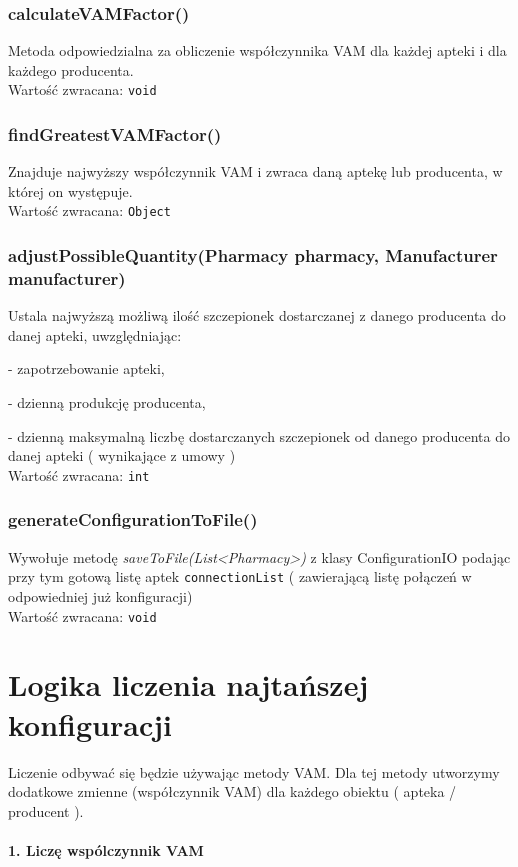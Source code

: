 \documentclass[]{article}
\begin{document}
    \subsubsection{calculateVAMFactor()}
    Metoda odpowiedzialna za obliczenie współczynnika VAM dla każdej apteki i dla każdego producenta. \\
    Wartość zwracana: \verb|void|

    \subsubsection{findGreatestVAMFactor()}
    Znajduje najwyższy współczynnik VAM i zwraca daną aptekę lub producenta, w której on występuje.\\
    Wartość zwracana: \verb|Object|

    \subsubsection{adjustPossibleQuantity(Pharmacy pharmacy, Manufacturer manufacturer)}
    Ustala najwyższą możliwą ilość szczepionek dostarczanej z danego producenta do danej apteki, uwzględniając:

    - zapotrzebowanie apteki,

    - dzienną produkcję producenta,

    - dzienną maksymalną liczbę dostarczanych szczepionek od danego producenta do danej apteki ( wynikające z umowy )\\
    Wartość zwracana: \verb|int|

    \subsubsection{generateConfigurationToFile()}
    Wywołuje metodę \textit{saveToFile(List<Pharmacy>)} z klasy ConfigurationIO podając przy tym gotową listę aptek \verb|connectionList| ( zawierającą listę połączeń w odpowiedniej już konfiguracji)\\
    Wartość zwracana: \verb|void|


    \section{Logika liczenia najtańszej konfiguracji}
    \newcommand\tab[1][1cm]{\hspace*{#1}}
    Liczenie odbywać się będzie używając metody VAM. Dla tej metody utworzymy dodatkowe zmienne (współczynnik VAM) dla każdego obiektu ( apteka / producent ).\\\\
    \textbf{1. Liczę wspólczynnik VAM}
    
\end{document}
